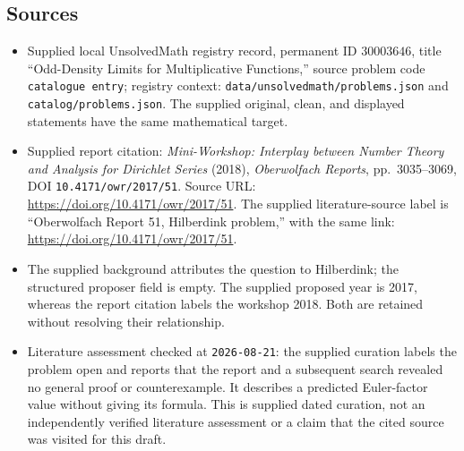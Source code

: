 \documentclass[11pt]{article}
\begin{document}
\subsection{Sources}
\begin{itemize}
\item Supplied local UnsolvedMath registry record, permanent ID \(30003646\), title ``Odd-Density Limits for Multiplicative Functions,'' source problem code \texttt{catalogue entry}; registry context: \texttt{data/unsolvedmath/problems.json} and \texttt{catalog/problems.json}. The supplied original, clean, and displayed statements have the same mathematical target.
\item Supplied report citation: \emph{Mini-Workshop: Interplay between Number Theory and Analysis for Dirichlet Series} (2018), \emph{Oberwolfach Reports}, pp.~3035--3069, DOI \texttt{10.4171/owr/2017/51}. Source URL: \url{https://doi.org/10.4171/owr/2017/51}. The supplied literature-source label is ``Oberwolfach Report 51, Hilberdink problem,'' with the same link: \url{https://doi.org/10.4171/owr/2017/51}.
\item The supplied background attributes the question to Hilberdink; the structured proposer field is empty. The supplied proposed year is 2017, whereas the report citation labels the workshop 2018. Both are retained without resolving their relationship.
\item Literature assessment checked at \texttt{2026-08-21}: the supplied curation labels the problem open and reports that the report and a subsequent search revealed no general proof or counterexample. It describes a predicted Euler-factor value without giving its formula. This is supplied dated curation, not an independently verified literature assessment or a claim that the cited source was visited for this draft.
\end{itemize}
\end{document}
